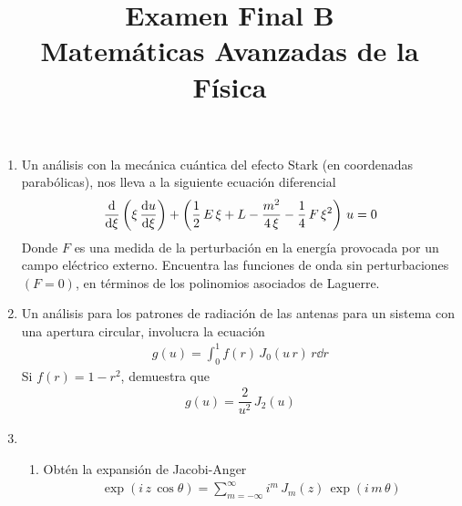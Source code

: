 
\author{}
\title{Examen Final B  \\ \large{Matemáticas Avanzadas de la Física}} \vspace{-1.5\baselineskip}
\date{ }

\vspace{-4cm}
\renewcommand\labelenumii{\theenumi.{\arabic{enumii})}}
\maketitle
\fontsize{14}{14}\selectfont
\begin{enumerate}
\item Un análisis con la mecánica cuántica del efecto Stark (en coordenadas parabólicas), nos lleva a la siguiente ecuación diferencial
\begin{align*}
\dv{\xi} \left( \xi \, \dv{u}{\xi}  \right) + \left( \dfrac{1}{2} \, E \, \xi + L - \dfrac{m^{2}}{4 \, \xi} - \dfrac{1}{4} \, F \, \xi^{2} \right) \, u = 0
\end{align*}
Donde $F$ es una medida de la perturbación en la energía provocada por un campo eléctrico externo. Encuentra las funciones de onda sin perturbaciones $(F=0)$, en términos de los polinomios asociados de Laguerre.
\item Un análisis para los patrones de radiación de las antenas para un sistema con una apertura circular, involucra la ecuación
\begin{align*}
g(u) = \int_{0}^{1} f(r) \, J_{0} (u \, r) \, r \dd{r}
\end{align*}
Si $f(r) = 1 - r^{2}$, demuestra que
\begin{align*}
g(u) = \dfrac{2}{u^{2}} \, J_{2}(u)
\end{align*}
\item \begin{enumerate}
\item Obtén la expansión de Jacobi-Anger
\begin{align*}
\exp(i \, z \, \cos \theta) = \sum_{m=-\infty}^{\infty} i^{m} \, J_{m}(z) \, \exp(i \, m \, \theta)

\end{align*}
\end{enumerate}
\end{enumerate}

